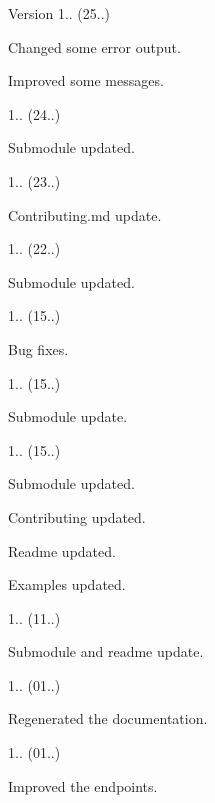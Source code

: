 \begin{DoxyVersion}{Version}
1.. (25..)
\begin{DoxyItemize}
\item Changed some error output.
\item Improved some messages. 
\end{DoxyItemize}

1.. (24..)
\begin{DoxyItemize}
\item Submodule updated. 
\end{DoxyItemize}

1.. (23..)
\begin{DoxyItemize}
\item Contributing.\+md update. 
\end{DoxyItemize}

1.. (22..)
\begin{DoxyItemize}
\item Submodule updated. 
\end{DoxyItemize}

1.. (15..)
\begin{DoxyItemize}
\item Bug fixes. 
\end{DoxyItemize}

1.. (15..)
\begin{DoxyItemize}
\item Submodule update. 
\end{DoxyItemize}

1.. (15..)
\begin{DoxyItemize}
\item Submodule updated.
\item Contributing updated.
\item Readme updated.
\item Examples updated. 
\end{DoxyItemize}

1.. (11..)
\begin{DoxyItemize}
\item Submodule and readme update. 
\end{DoxyItemize}

1.. (01..)
\begin{DoxyItemize}
\item Regenerated the documentation. 
\end{DoxyItemize}

1.. (01..)
\begin{DoxyItemize}
\item Improved the endpoints. 
\end{DoxyItemize}


\end{DoxyVersion}
